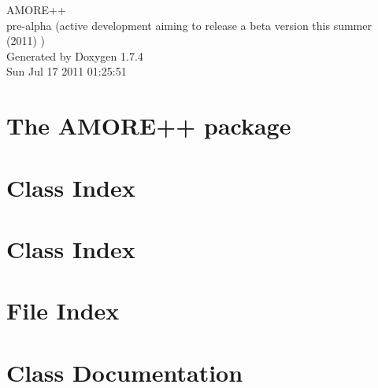 \documentclass[a4paper]{book}
\begin{document}
\hypersetup{pageanchor=false}
\begin{titlepage}
\vspace*{7cm}
\begin{center}
{\Large AMORE++ \\[1ex]\large pre-\/alpha (active development aiming to release a beta version this summer (2011) ) }\\
\vspace*{1cm}
{\large Generated by Doxygen 1.7.4}\\
\vspace*{0.5cm}
{\small Sun Jul 17 2011 01:25:51}\\
\end{center}
\end{titlepage}
\clearemptydoublepage
{}
\tableofcontents
\clearemptydoublepage
{}
\hypersetup{pageanchor=true}
\chapter{The AMORE++ package}
\label{index}\hypertarget{index}{}
\chapter{Class Index}

\chapter{Class Index}

\chapter{File Index}

\chapter{Class Documentation}






















\end{document}
